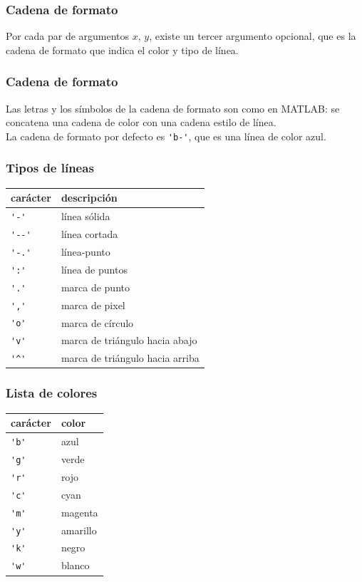 \begin{frame}[fragile]
\frametitle{Cadena de formato}
Por cada par de argumentos $x$, $y$, existe un tercer argumento opcional, que es la cadena de formato que indica el color y tipo de línea.
\end{frame}
\begin{frame}[fragile]
\frametitle{Cadena de formato}
Las letras y los símbolos de la cadena de formato son como en MATLAB: se concatena una cadena de color con una cadena estilo de línea.
\\
\bigskip
La cadena de formato por defecto es \verb|'b-'|, que es una línea de color azul.
\end{frame}
\begin{frame}[fragile]
\frametitle{Tipos de líneas}
\fontsize{10}{10}\selectfont
\begin{tabular}{l | l}
carácter & descripción \\ \hline
\verb|'-'|	& línea sólida \\ \hline
\verb|'--'| & línea cortada \\ \hline
\verb|'-.'| & línea-punto \\ \hline
\verb|':'|	& línea de puntos \\ \hline
\verb|'.'|	& marca de punto \\ \hline
\verb|','|	& marca de pixel \\ \hline
\verb|'o'|	& marca de círculo \\ \hline
\verb|'v'|	& marca de triángulo hacia abajo \\ \hline
\verb|'^'|	& marca de triángulo hacia arriba
\end{tabular}
\end{frame}
\begin{frame}[fragile]
\frametitle{Lista de colores}
\fontsize{10}{10}\selectfont
\begin{tabular}{l | l}
carácter & color \\ \hline
\verb|'b'| & azul \\ \hline
\verb|'g'| & verde \\ \hline
\verb|'r'| & rojo \\ \hline
\verb|'c'| & cyan \\ \hline
\verb|'m'| & magenta \\ \hline
\verb|'y'| & amarillo \\ \hline
\verb|'k'| & negro \\ \hline
\verb|'w'| & blanco
\end{tabular}
\end{frame}
